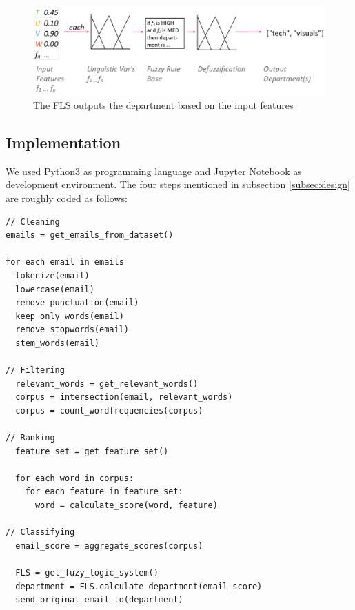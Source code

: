 \documentclass[journal]{IEEEtran}
\begin{document}
\begin{enumerate}
    \begin{figure}[ht!]
        \centering
        \includegraphics[width=.9\linewidth]{res/classifying}
        \caption{The FLS outputs the department based on the input features}
        \label{fig:classifying}
    \end{figure}
    
\end{enumerate}


\subsection{Implementation}
We used Python3 as programming language and Jupyter Notebook as development 
environment. The four steps mentioned in subsection \ref{subsec:design} are 
roughly coded as follows:

\begin{lstlisting}
// Cleaning
emails = get_emails_from_dataset()

for each email in emails
  tokenize(email)
  lowercase(email)
  remove_punctuation(email)
  keep_only_words(email)
  remove_stopwords(email)
  stem_words(email)

// Filtering
  relevant_words = get_relevant_words()
  corpus = intersection(email, relevant_words)
  corpus = count_wordfrequencies(corpus)
	
// Ranking
  feature_set = get_feature_set()
	
  for each word in corpus:
    for each feature in feature_set:
	  word = calculate_score(word, feature)

// Classifying
  email_score = aggregate_scores(corpus)
	
  FLS = get_fuzy_logic_system()
  department = FLS.calculate_department(email_score)
  send_original_email_to(department)
\end{lstlisting}


\end{document}
